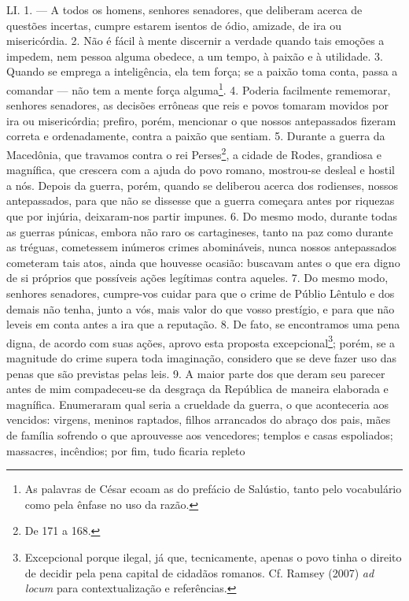 LI. 1. --- A todos os homens, senhores senadores, que deliberam acerca de
questões incertas, cumpre estarem isentos de ódio, amizade, de ira ou
misericórdia. 2. Não é fácil à mente discernir a verdade quando tais emoções a
impedem, nem pessoa alguma obedece, a um tempo, à paixão e à utilidade. 3.
Quando se emprega a inteligência, ela tem força; se a paixão toma conta, passa
a comandar --- não tem a mente força alguma\footnote{As palavras de César ecoam
as do prefácio de Salústio, tanto pelo vocabulário como pela ênfase no uso da
razão.}. 4. Poderia facilmente rememorar, senhores senadores, as decisões
errôneas que reis e povos tomaram movidos por ira ou misericórdia; prefiro,
porém, mencionar o que nossos antepassados fizeram correta e ordenadamente,
contra a paixão que sentiam. 5. Durante a guerra da Macedônia, que travamos
contra o rei Perses\footnote{De 171 a 168.}, a cidade de Rodes, grandiosa e
magnífica, que crescera com a ajuda do povo romano, mostrou-se desleal e hostil
a nós. Depois da guerra, porém, quando se deliberou acerca dos rodienses,
nossos antepassados, para que não se dissesse que a guerra começara antes por
riquezas que por injúria, deixaram-nos partir impunes. 6. Do mesmo modo,
durante todas as guerras púnicas, embora não raro os cartagineses, tanto na paz
como durante as tréguas, cometessem inúmeros crimes abomináveis, nunca nossos
antepassados cometeram tais atos, ainda que houvesse ocasião: buscavam antes o
que era digno de si próprios que possíveis ações legítimas contra aqueles. 7.
Do mesmo modo, senhores senadores, cumpre-vos cuidar para que o crime de
Públio Lêntulo e dos demais não tenha, junto a vós, mais valor do que vosso
prestígio, e para que não leveis em conta antes a ira que a reputação. 8. De
fato, se encontramos uma pena digna, de acordo com suas ações, aprovo esta
proposta excepcional\footnote{Excepcional porque ilegal, já que, tecnicamente,
apenas o povo tinha o direito de decidir pela pena capital de cidadãos romanos.
Cf. Ramsey (2007) \emph{ad locum} para contextualização e referências.}; porém,
se a magnitude do crime supera toda imaginação, considero que se deve fazer uso
das penas que são previstas pelas leis. 9. A maior parte dos que deram seu
parecer antes de mim compadeceu-se da desgraça da República de maneira
elaborada e magnífica. Enumeraram qual seria a crueldade da guerra, o que
aconteceria aos vencidos: virgens, meninos raptados, filhos arrancados do
abraço dos pais, mães de família sofrendo o que aprouvesse aos vencedores;
templos e casas espoliados; massacres, incêndios; por fim, tudo ficaria repleto
